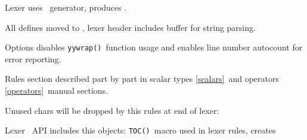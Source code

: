 \label{lexer}

Lexer uses \ generator, produces .
\bigskip

All defines moved to , lexer header includes
buffer for string parsing.


Options disables \verb|yywrap()|\ function usage and enables line number
autocount for error reporting.


Rules section described part by part in scalar types \ref{scalars}\ and
operators \ref{operators}\ manual sections.


Unused chars will be dropped by this rules at end of lexer:


Lexer \cpp\ API includes this objects: \verb|TOC()|\ macro used in lexer rules,
creates 


